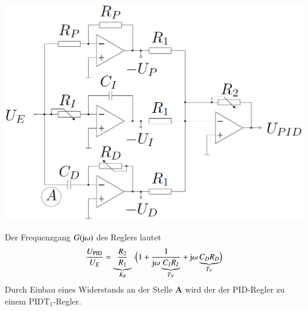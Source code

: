 \begin{minipage}[c]{0.45\columnwidth}
    \includegraphics[width=\columnwidth]{images/realisierung_pid-regler_variante_2.png}
\end{minipage}
\hfill
\begin{minipage}[c]{0.52\columnwidth}
    Der Frequenzgang $G(\mathrm{j} \omega)$ des Reglers lautet
    $$ \frac{U_{\rm PID}}{U_E} = \underbrace{ \frac{R_2}{R_1} }_{K_R} \cdot \Bigl( 1 + \frac{1}{\mathrm{j} \omega \underbrace{C_I R_I}_{T_N}} 
        + \mathrm{j} \omega \underbrace{ C_D R_D }_{T_V} \Bigr) $$
    Durch Einbau eines Widerstands an der Stelle \textbf{A} wird der der PID-Regler zu einem $\text{PIDT}_1$-Regler.
\end{minipage}


